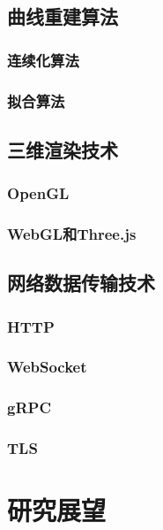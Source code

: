 \subsection{曲线重建算法}
\subsubsection{连续化算法}
\subsubsection{拟合算法}
\subsection{三维渲染技术}
\subsubsection{OpenGL}
\subsubsection{WebGL和Three.js}
\subsection{网络数据传输技术}
\subsubsection{HTTP}
\subsubsection{WebSocket}
\subsubsection{gRPC}
\subsubsection{TLS}
\section{研究展望}
\newpage
\printbibliography[title={参考文献}]
